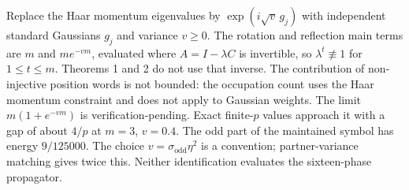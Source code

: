 \begin{theorem}
\label{thm:momentum-phase-crossover}
Replace the Haar momentum eigenvalues by \(\exp(i\sqrt{v}\,g_j)\) with independent standard Gaussians \(g_j\) and variance \(v\ge 0\). The rotation and reflection main terms are \(m\) and \(m e^{-vm}\), evaluated where \(A=I-\lambda C\) is invertible, so \(\lambda^t\not\equiv 1\) for \(1\le t\le m\). Theorems 1 and 2 do not use that inverse. The contribution of non-injective position words is not bounded: the occupation count uses the Haar momentum constraint and does not apply to Gaussian weights. The limit \(m(1+e^{-vm})\) is verification-pending. Exact finite-\(p\) values approach it with a gap of about \(4/p\) at \(m=3\), \(v=0.4\). The odd part of the maintained symbol has energy \(9/125000\). The choice \(v=\sigma_{\mathrm{odd}}\eta^2\) is a convention; partner-variance matching gives twice this. Neither identification evaluates the sixteen-phase propagator.
\end{theorem}
